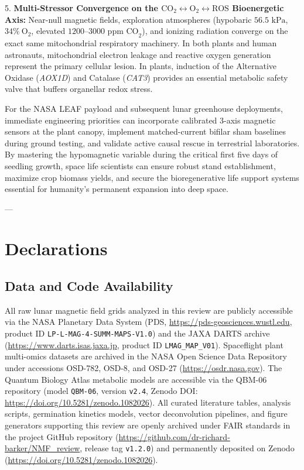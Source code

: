 \documentclass[default,sn-nature,iicol]{sn-jnl}
\begin{document}
5. \textbf{Multi-Stressor Convergence on the $\text{CO}_2 \leftrightarrow \text{O}_2 \leftrightarrow \text{ROS}$ Bioenergetic Axis:} Near-null magnetic fields, exploration atmospheres (hypobaric $56.5\text{ kPa}$, $34\%\ \text{O}_2$, elevated $1200\text{--}3000\text{ ppm CO}_2$), and ionizing radiation converge on the exact same mitochondrial respiratory machinery. In both plants and human astronauts, mitochondrial electron leakage and reactive oxygen generation represent the primary cellular lesion. In plants, induction of the Alternative Oxidase (\textit{AOX1D}) and Catalase (\textit{CAT3}) provides an essential metabolic safety valve that buffers organellar redox stress.

For the NASA LEAF payload and subsequent lunar greenhouse deployments, immediate engineering priorities can incorporate calibrated 3-axis magnetic sensors at the plant canopy, implement matched-current bifilar sham baselines during ground testing, and validate active causal rescue in terrestrial laboratories. By mastering the hypomagnetic variable during the critical first five days of seedling growth, space life scientists can ensure robust stand establishment, maximize crop biomass yields, and secure the bioregenerative life support systems essential for humanity's permanent expansion into deep space.

---



\section*{Declarations}

\subsection*{Data and Code Availability}
All raw lunar magnetic field grids analyzed in this review are publicly accessible via the NASA Planetary Data System (PDS, \url{https://pds-geosciences.wustl.edu}, product ID \texttt{LP-L-MAG-4-SUMM-MAPS-V1.0}) and the JAXA DARTS archive (\url{https://www.darts.isas.jaxa.jp}, product ID \texttt{LMAG\_MAP\_V01}). Spaceflight plant multi-omics datasets are archived in the NASA Open Science Data Repository under accessions OSD-782, OSD-8, and OSD-27 (\url{https://osdr.nasa.gov}). The Quantum Biology Atlas metabolic models are accessible via the QBM-06 repository (model \texttt{QBM-06}, version \texttt{v2.4}, Zenodo DOI: \url{https://doi.org/10.5281/zenodo.1082026}). All curated literature tables, analysis scripts, germination kinetics models, vector deconvolution pipelines, and figure generators supporting this review are openly archived under FAIR standards in the project GitHub repository (\url{https://github.com/dr-richard-barker/NMF_review}, release tag \texttt{v1.2.0}) and permanently deposited on Zenodo (\url{https://doi.org/10.5281/zenodo.1082026}).
\end{document}
